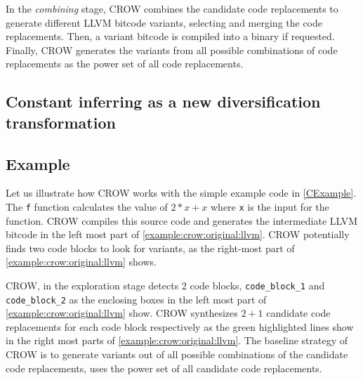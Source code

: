 
In the \emph{combining} stage, CROW combines the candidate code replacements to generate different LLVM bitcode variants, selecting and merging the code replacements. 
Then, a variant bitcode is compiled into a \wasm binary if requested. Finally, CROW generates the variants from all possible combinations of code replacements as the power set of all code replacements.  

\subsection*{Constant inferring as a new diversification transformation}



\subsection*{Example}
\label{section:crow:example}
 Let us illustrate how CROW works with the simple example code in \autoref{CExample}. The \texttt{f} function calculates the value of $2 * x + x$ where \texttt{x} is the input for the function.  CROW compiles this source code and generates the intermediate LLVM bitcode in the left most part of \autoref{example:crow:original:llvm}. CROW potentially finds two code blocks to look for variants, as the right-most part of \autoref{example:crow:original:llvm} shows.


    

CROW, in the exploration stage detects 2 code blocks, \texttt{code\_block\_1} and \texttt{code\_block\_2} as the enclosing boxes in the left most part of \autoref{example:crow:original:llvm} show. CROW synthesizes $2 + 1$ candidate code replacements for each code block respectively as the green highlighted lines show in the right most parts of \autoref{example:crow:original:llvm}.
The baseline strategy of CROW is to generate variants out of all possible combinations of the candidate code replacements, \ie uses the power set of all candidate code replacements.

